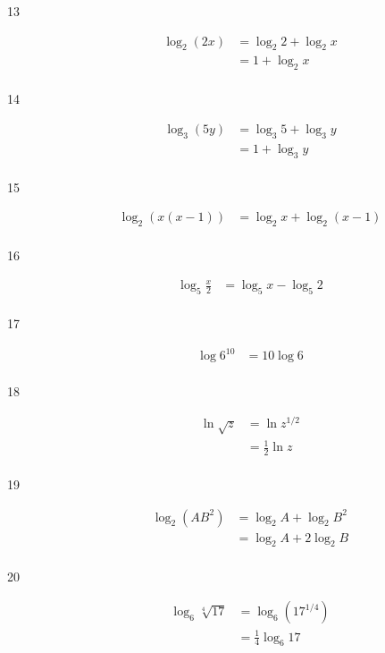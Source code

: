 \documentclass{exam}
\begin{document}
\begin{description}
      \item[13] 
        \begin{align*}
          \log_2 \left( 2x \right) &= \log_2 2 + \log_2 x \\
                                   &= \boxed{1 + \log_2 x} \\
        \end{align*}

      \item[14] 
        \begin{align*}
          \log_3 \left( 5y \right) &= \log_3 5 + \log_3 y \\
                                   &= \boxed{1 + \log_3 y} \\
        \end{align*}

      \item[15] 
        \begin{align*}
          \log_2 (x (x - 1)) &= \boxed{\log_2 x + \log_2 (x - 1)} \\
        \end{align*}

      \item[16] 
        \begin{align*}
          \log_5 \frac{x}{2} &= \boxed{\log_5 x - \log_5 2} \\
        \end{align*}

      \item[17] 
        \begin{align*}
          \log 6^{10} &= \boxed{10 \log 6} \\
        \end{align*}

      \item[18] 
        \begin{align*}
          \ln \sqrt{z} &= \ln z^{1/2} \\
                       &= \boxed{\frac{1}{2} \ln z} \\
        \end{align*}

      \item[19] 
        \begin{align*}
          \log_2 \left( AB^2 \right) &= \log_2 A + \log_2 B^2 \\
                                     &= \boxed{\log_2 A + 2 \log_2 B} \\
        \end{align*}
      \item[20] 
        \begin{align*}
          \log_6 \sqrt[4]{17} &= \log_6 \left( 17^{1/4} \right) \\
                              &= \boxed{\frac{1}{4} \log_6 17} \\
        \end{align*}


\end{description}
\end{document}
